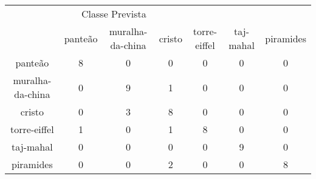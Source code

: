 \begin{tabular}{|c|c|c|c|c|c|c|}
\hline
\multicolumn{5}{|c|}{Classe Prevista}\\
 & panteão & muralha-da-china & cristo & torre-eiffel & taj-mahal & piramides\\
panteão & 8 & 0 & 0 & 0 & 0 & 0\\
muralha-da-china & 0 & 9 & 1 & 0 & 0 & 0\\
cristo & 0 & 3 & 8 & 0 & 0 & 0\\
torre-eiffel & 1 & 0 & 1 & 8 & 0 & 0\\
taj-mahal & 0 & 0 & 0 & 0 & 9 & 0\\
piramides & 0 & 0 & 2 & 0 & 0 & 8\\
\end{tabular}
